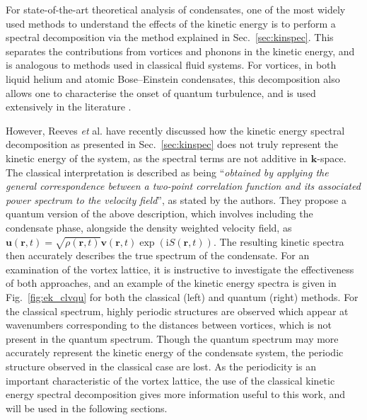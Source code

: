 For state-of-the-art theoretical analysis of condensates, one of the most widely used methods to understand the effects of the kinetic energy is to perform a spectral decomposition via the method explained in Sec.~\ref{sec:kinspec}. This separates the contributions from vortices and phonons in the kinetic energy, and is analogous to methods used in classical fluid systems. For vortices, in both liquid helium and atomic Bose--Einstein condensates, this decomposition also allows one to characterise the onset of quantum turbulence, and is used extensively in the literature \cite{VTX:Kobayashi_prl_2005,VTX:Tsubota_jphys_2009,CT:Bradley_prx_2012,VTX:White_jphys_2014,VTX:Skaugen_pre_2016}. %

However, Reeves {\it et} al. \cite{VTX:Reeves_pra_2014} have recently discussed how the kinetic energy spectral decomposition as presented in Sec.~\ref{sec:kinspec} does not truly represent the kinetic energy of the system, as the spectral terms are not additive in $\mathbf{k}$-space. The classical interpretation is described as being ``\textit{obtained by applying the general correspondence between a two-point correlation function and its associated
power spectrum to the velocity field}'', as stated by the authors. They propose a quantum version of the above description, which involves including the condensate phase, alongside the density weighted velocity field, as $\mathbf{u}(\mathbf{r},t) = \sqrt{\rho(\mathbf{r},t)}\mathbf{v}(\mathbf{r},t)\exp\left(\textrm{i}S(\mathbf{r},t)\right)$. The resulting kinetic spectra then accurately describes the true spectrum of the condensate. For an examination of the vortex lattice, it is instructive to investigate the effectiveness of both approaches, and an example of the kinetic energy spectra is given in Fig.~\ref{fig:ek_clvqu} for both the classical (left) and quantum (right) methods. For the classical spectrum, highly periodic structures are observed which appear at wavenumbers corresponding to the distances between vortices, which is not present in the quantum spectrum. Though the quantum spectrum may more accurately represent the kinetic energy of the condensate system, the periodic structure observed in the classical case are lost. As the periodicity is an important characteristic of the vortex lattice, the use of the classical kinetic energy spectral decomposition gives more information useful to this work, and will be used in the following sections.

